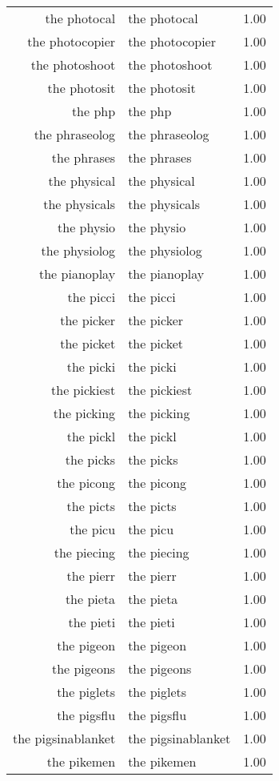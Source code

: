 \begin{table}[ht]
\begin{tabular}{rlr}
  the photocal & the photocal & 1.00 \\ 
  the photocopier & the photocopier & 1.00 \\ 
  the photoshoot & the photoshoot & 1.00 \\ 
  the photosit & the photosit & 1.00 \\ 
  the php & the php & 1.00 \\ 
  the phraseolog & the phraseolog & 1.00 \\ 
  the phrases & the phrases & 1.00 \\ 
  the physical & the physical & 1.00 \\ 
  the physicals & the physicals & 1.00 \\ 
  the physio & the physio & 1.00 \\ 
  the physiolog & the physiolog & 1.00 \\ 
  the pianoplay & the pianoplay & 1.00 \\ 
  the picci & the picci & 1.00 \\ 
  the picker & the picker & 1.00 \\ 
  the picket & the picket & 1.00 \\ 
  the picki & the picki & 1.00 \\ 
  the pickiest & the pickiest & 1.00 \\ 
  the picking & the picking & 1.00 \\ 
  the pickl & the pickl & 1.00 \\ 
  the picks & the picks & 1.00 \\ 
  the picong & the picong & 1.00 \\ 
  the picts & the picts & 1.00 \\ 
  the picu & the picu & 1.00 \\ 
  the piecing & the piecing & 1.00 \\ 
  the pierr & the pierr & 1.00 \\ 
  the pieta & the pieta & 1.00 \\ 
  the pieti & the pieti & 1.00 \\ 
  the pigeon & the pigeon & 1.00 \\ 
  the pigeons & the pigeons & 1.00 \\ 
  the piglets & the piglets & 1.00 \\ 
  the pigsflu & the pigsflu & 1.00 \\ 
  the pigsinablanket & the pigsinablanket & 1.00 \\ 
  the pikemen & the pikemen & 1.00 \\ 

\end{tabular}
\end{table}
